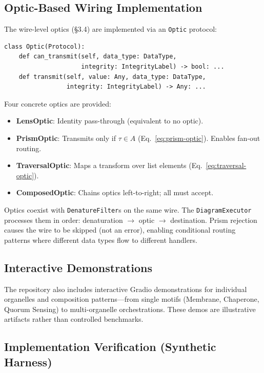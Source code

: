 \subsection{Optic-Based Wiring Implementation}

The wire-level optics (\S3.4) are implemented via an \texttt{Optic} protocol:

\begin{verbatim}
class Optic(Protocol):
    def can_transmit(self, data_type: DataType,
                     integrity: IntegrityLabel) -> bool: ...
    def transmit(self, value: Any, data_type: DataType,
                 integrity: IntegrityLabel) -> Any: ...
\end{verbatim}

Four concrete optics are provided:
\begin{itemize}[leftmargin=*]
\item \textbf{LensOptic}: Identity pass-through (equivalent to no optic).
\item \textbf{PrismOptic}: Transmits only if $\tau \in A$ (Eq.~\eqref{eq:prism-optic}). Enables fan-out routing.
\item \textbf{TraversalOptic}: Maps a transform over list elements (Eq.~\eqref{eq:traversal-optic}).
\item \textbf{ComposedOptic}: Chains optics left-to-right; all must accept.
\end{itemize}

Optics coexist with \texttt{DenatureFilter}s on the same wire. The \texttt{DiagramExecutor} processes them in order: denaturation $\to$ optic $\to$ destination. Prism rejection causes the wire to be skipped (not an error), enabling conditional routing patterns where different data types flow to different handlers.

\subsection{Interactive Demonstrations}

The repository also includes interactive Gradio demonstrations for individual organelles and composition
patterns---from single motifs (Membrane, Chaperone, Quorum Sensing) to multi-organelle orchestrations.
These demos are illustrative artifacts rather than controlled benchmarks.

\subsection{Implementation Verification (Synthetic Harness)}\label{sec:empirical}


